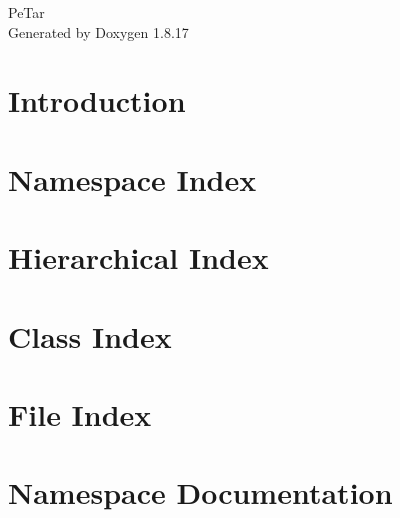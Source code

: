 \let\mypdfximage\pdfximage\def\pdfximage{\immediate\mypdfximage}\documentclass[twoside]{book}
\newcommand{\+}{\discretionary{\mbox{\scriptsize$\hookleftarrow$}}{}{}}
\newcommand{\clearemptydoublepage}{%
  \newpage{\pagestyle{empty}\cleardoublepage}%
}
\begin{document}
\hypersetup{pageanchor=false,
             bookmarksnumbered=true,
             pdfencoding=unicode
            }
\begin{titlepage}
\vspace*{7cm}
\begin{center}%
{\Large Pe\+Tar }\\
\vspace*{1cm}
{\large Generated by Doxygen 1.8.17}\\
\end{center}
\end{titlepage}
\clearemptydoublepage
{}
\tableofcontents
\clearemptydoublepage
{}
\hypersetup{pageanchor=true}

\chapter{Introduction}
\label{index}\hypertarget{index}{}
\chapter{Namespace Index}

\chapter{Hierarchical Index}

\chapter{Class Index}

\chapter{File Index}

\chapter{Namespace Documentation}



\end{document}
